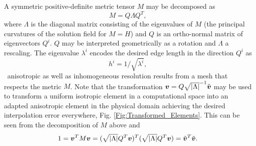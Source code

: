 A symmetric positive-definite metric tensor $M$ may be decomposed as
\begin{equation*}
M = Q \Lambda Q^T,
\end{equation*}
where $\Lambda$ is the diagonal matrix consisting of the eigenvalues
of $M$ (the principal curvatures of the solution field for $M=H$) and
$Q$ is an ortho-normal matrix of eigenvectors ${Q}^i$. $Q$ may be
interpreted geometrically as a rotation and $\Lambda$ a rescaling.
The eigenvalue $\lambda^i$ encodes the desired edge length in the
direction ${Q}^i$ as
\begin{equation*}
h^i = 1 / \sqrt{{\lambda}^i},
\end{equation*}
\ie\ anisotropic as well as inhomogeneous resolution results from a
mesh that respects the metric $M$. Note that the transformation
${{\mbox{\boldmath$v$}}}=Q\sqrt{|\Lambda|}^{-1}\tilde{{\mbox{\boldmath$v$}}}$ may be used to transform a
uniform isotropic element in a computational space into an adapted
anisotropic element in the physical domain achieving the desired
interpolation error everywhere,
Fig. \ref{Fig:Transformed_Elements}. This can be seen from the
decomposition of $M$ above and
\begin{equation*}
1={{\mbox{\boldmath$v$}}}^T  M {{\mbox{\boldmath$v$}}} = (\sqrt{|\Lambda|}Q^T{\mbox{\boldmath$v$}})^T(\sqrt{|\Lambda|}Q^T{\mbox{\boldmath$v$}})=\tilde{{\mbox{\boldmath$v$}}}^T\tilde{{\mbox{\boldmath$v$}}}.
\end{equation*}

